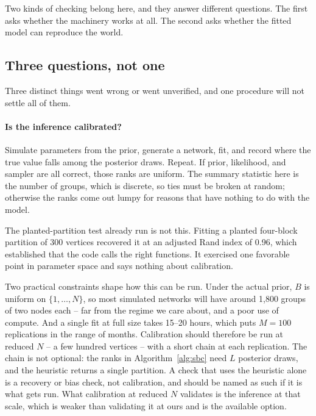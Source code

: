 \documentclass[11pt]{article}
\begin{document}
Two kinds of checking belong here, and they answer different questions. The
first asks whether the machinery works at all. The second asks whether the
fitted model can reproduce the world.

\subsection{Three questions, not one}

Three distinct things went wrong or went unverified, and one procedure will not
settle all of them.

\paragraph{Is the inference calibrated?} Simulate parameters from the prior,
generate a network, fit, and record where the true value falls among the
posterior draws. Repeat. If prior, likelihood, and sampler are all correct,
those ranks are uniform. The summary statistic here is the number of groups,
which is discrete, so ties must be broken at random; otherwise the ranks come
out lumpy for reasons that have nothing to do with the model.

The planted-partition test already run is not this. Fitting a planted
four-block partition of 300 vertices recovered it at an adjusted Rand index of
0.96, which established that the code calls the right functions. It exercised
one favorable point in parameter space and says nothing about calibration.

Two practical constraints shape how this can be run. Under the actual prior,
$B$ is uniform on $\{1, \dots, N\}$, so most simulated networks will have
around 1{,}800 groups of two nodes each -- far from the regime we care about,
and a poor use of compute. And a single fit at full size takes 15--20 hours,
which puts $M = 100$ replications in the range of months. Calibration should
therefore be run at reduced $N$ -- a few hundred vertices -- with a short
chain at each replication. The chain is not optional: the ranks in
Algorithm~\ref{alg:sbc} need $L$ posterior draws, and the heuristic returns a
single partition. A check that uses the heuristic alone is a recovery or bias
check, not calibration, and should be named as such if it is what gets run.
What calibration at reduced $N$ validates is the inference at that scale,
which is weaker than validating it at ours and is the available option.
\end{document}
